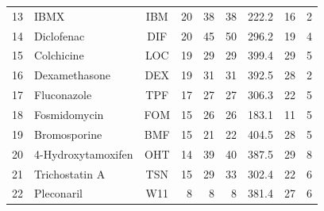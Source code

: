 \begin{longtable}{@{}rlcrrrrrr@{}}
13 & IBMX & IBM & 20 & 38 & 38 & 222.2 & 16 & 2\\
14 & Diclofenac & DIF & 20 & 45 & 50 & 296.2 & 19 & 4\\
15 & Colchicine & LOC & 19 & 29 & 29 & 399.4 & 29 & 5\\
16 & Dexamethasone & DEX & 19 & 31 & 31 & 392.5 & 28 & 2\\
17 & Fluconazole & TPF & 17 & 27 & 27 & 306.3 & 22 & 5\\
18 & Fosmidomycin & FOM & 15 & 26 & 26 & 183.1 & 11 & 5\\
19 & Bromosporine & BMF & 15 & 21 & 22 & 404.5 & 28 & 5\\
20 & 4-Hydroxytamoxifen & OHT & 14 & 39 & 40 & 387.5 & 29 & 8\\
21 & Trichostatin A & TSN & 15 & 29 & 33 & 302.4 & 22 & 6\\
22 & Pleconaril & W11 & 8 & 8 & 8 & 381.4 & 27 & 6\\
\end{longtable}
\endgroup
